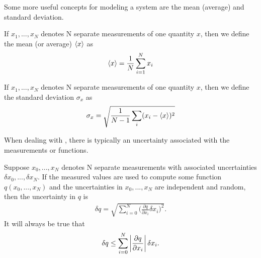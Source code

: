 Some more useful concepts for modeling a system are the mean (average) and standard deviation. 

\begin{defn}
	If $x_1, ..., x_N$ denotes N separate measurements of one quantity $x$, then we define the mean (or average) $\braket{x}$ as
	\begin{align}
		\braket{x} = \frac{1}{N}\sum_{i=1}^{N}x_i \label{mean equation}
	\end{align}
\end{defn}

\begin{defn}
	If $x_1, ..., x_N$ denotes N separate measurements of one quantity $x$, then we define the standard deviation $\sigma_x$ as
	\begin{align}
		\sigma_x = \sqrt{\frac{1}{N-1}\sum_{i}(x_i-\braket{x})^2}
	\end{align}
\end{defn}

When dealing with , there is typically an uncertainty associated with the measurements or functions.

\begin{defn}
	Suppose $x_0, ..., x_N$ denotes N separate measurements with associated uncertainties $\delta x_0, ..., \delta x_N$. If the measured values are used to compute some function $q(x_0, ..., x_N)$ and the uncertainties in $x_0, ..., x_N$ are independent and random, then the uncertainty in $q$ is
	\begin{align}
		\delta q = \sqrt{\sum_{i=0}^{N}\bigg(\frac{\partial q}{\partial x_i} \delta x_i\bigg)^2}.
	\end{align}
 It will always be true that 
 	\begin{align}
		\delta q \leq \sum_{i=0}^{N}\left| \frac{\partial q}{\partial x_i} \right| \delta x_i.
	\end{align}
\end{defn}
